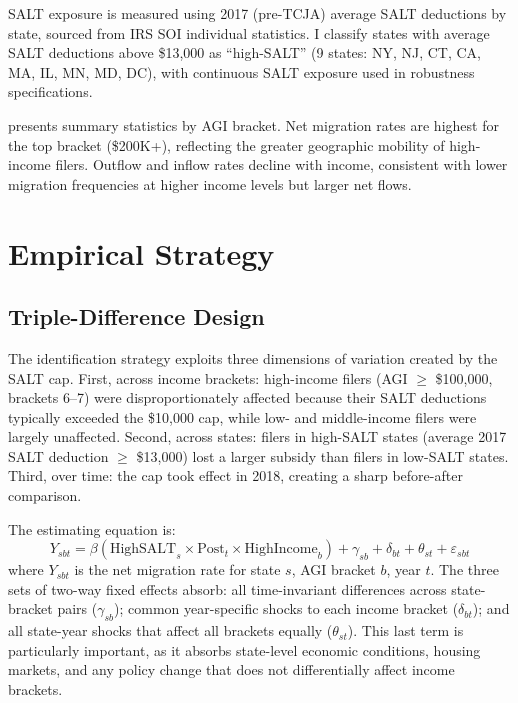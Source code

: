 \documentclass[12pt]{article}
\begin{document}
SALT exposure is measured using 2017 (pre-TCJA) average SALT deductions by state, sourced from IRS SOI individual statistics. I classify states with average SALT deductions above \$13,000 as ``high-SALT'' (9 states: NY, NJ, CT, CA, MA, IL, MN, MD, DC), with continuous SALT exposure used in robustness specifications.

 presents summary statistics by AGI bracket. Net migration rates are highest for the top bracket (\$200K+), reflecting the greater geographic mobility of high-income filers. Outflow and inflow rates decline with income, consistent with lower migration frequencies at higher income levels but larger net flows.




\section{Empirical Strategy}

\subsection{Triple-Difference Design}

The identification strategy exploits three dimensions of variation created by the SALT cap. First, across income brackets: high-income filers (AGI $\geq$ \$100,000, brackets 6--7) were disproportionately affected because their SALT deductions typically exceeded the \$10,000 cap, while low- and middle-income filers were largely unaffected. Second, across states: filers in high-SALT states (average 2017 SALT deduction $\geq$ \$13,000) lost a larger subsidy than filers in low-SALT states. Third, over time: the cap took effect in 2018, creating a sharp before-after comparison.

The estimating equation is:
\begin{equation}
Y_{sbt} = \beta \left(\text{HighSALT}_s \times \text{Post}_t \times \text{HighIncome}_b \right) + \gamma_{sb} + \delta_{bt} + \theta_{st} + \varepsilon_{sbt} \label{eq:triple}
\end{equation}
where $Y_{sbt}$ is the net migration rate for state $s$, AGI bracket $b$, year $t$. The three sets of two-way fixed effects absorb: all time-invariant differences across state-bracket pairs ($\gamma_{sb}$); common year-specific shocks to each income bracket ($\delta_{bt}$); and all state-year shocks that affect all brackets equally ($\theta_{st}$). This last term is particularly important, as it absorbs state-level economic conditions, housing markets, and any policy change that does not differentially affect income brackets.
\end{document}
